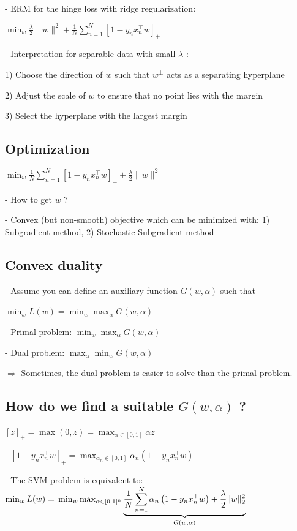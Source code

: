 - ERM for the hinge loss with ridge regularization:

$
\min _{w} \frac{\lambda}{2}\|w\|^{2}+\frac{1}{N} \sum_{n=1}^{N}\left[1-y_{n} x_{n}^{\top} w\right]_{+}
$

- Interpretation for separable data with small $\lambda$ :

1) Choose the direction of $w$ such that $w^{\perp}$ acts as a separating hyperplane

2) Adjust the scale of $w$ to ensure that no point lies with the margin

3) Select the hyperplane with the largest margin


\subsection*{Optimization}
$
\min _{w} \frac{1}{N} \sum_{n=1}^{N}\left[1-y_{n} x_{n}^{\top} w\right]_{+}+\frac{\lambda}{2}\|w\|^{2}
$

- How to get $w$ ?

- Convex (but non-smooth) objective which can be minimized with: 1) Subgradient method, 2) Stochastic Subgradient method

\subsection*{Convex duality}
- Assume you can define an auxiliary function $G(w, \alpha)$ such that

$
\min _{w} L(w)=\min _{w} \max _{\alpha} G(w, \alpha)
$

- Primal problem: $\min _{w} \max _{\alpha} G(w, \alpha)$

- Dual problem: $\max _{\alpha} \min _{w} G(w, \alpha)$

$\Rightarrow$ Sometimes, the dual problem is easier to solve than the primal problem.

\subsection*{How do we find a suitable $G(w, \alpha)$ ?}
$
[z]_{+}=\max (0, z)=\max _{\alpha \in[0,1]} \alpha z
$

- $\left[1-y_{n} x_{n}^{\top} w\right]_{+}=\max _{\alpha_{n} \in[0,1]} \alpha_{n}\left(1-y_{n} x_{n}^{\top} w\right)$

- The SVM problem is equivalent to:
$
\min _{w} L(w)=\\\min _{w} \max _{\alpha \in[0,1]^{n}} \underbrace{\frac{1}{N} \sum_{n=1}^{N} \alpha_{n}\left(1-y_{n} x_{n}^{\top} w\right)+\frac{\lambda}{2}\|w\|_{2}^{2}}_{G(w, \alpha)}
$

